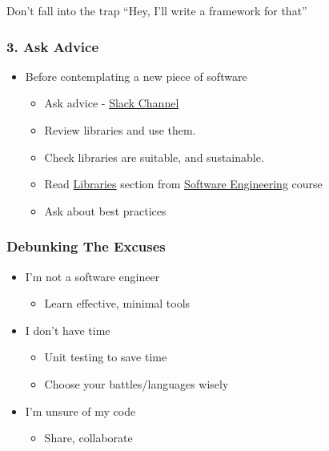 Don't fall into the trap ``Hey, I'll write a framework for that''

\hypertarget{ask-advice}{%
\subsubsection{3. Ask Advice}\label{ask-advice}}

\begin{itemize}
\tightlist
\item
  Before contemplating a new piece of software

  \begin{itemize}
  \tightlist
  \item
    Ask advice - \href{https://ucl-programming-hub.slack.com/}{Slack
    Channel}
  \item
    Review libraries and use them.
  \item
    Check libraries are suitable, and sustainable.
  \item
    Read
    \href{http://development.rc.ucl.ac.uk/training/engineering/ch04packaging/01Libraries.html}{Libraries}
    section from
    \href{http://github-pages.ucl.ac.uk/rsd-engineeringcourse/}{Software
    Engineering} course
  \item
    Ask about best practices
  \end{itemize}
\end{itemize}

\hypertarget{debunking-the-excuses}{%
\subsubsection{Debunking The Excuses}\label{debunking-the-excuses}}

\begin{itemize}
\tightlist
\item
  I'm not a software engineer

  \begin{itemize}
  \tightlist
  \item
    Learn effective, minimal tools
  \end{itemize}
\item
  I don't have time

  \begin{itemize}
  \tightlist
  \item
    Unit testing to save time
  \item
    Choose your battles/languages wisely
  \end{itemize}
\item
  I'm unsure of my code

  \begin{itemize}
  \tightlist
  \item
    Share, collaborate
  \end{itemize}
\end{itemize}

